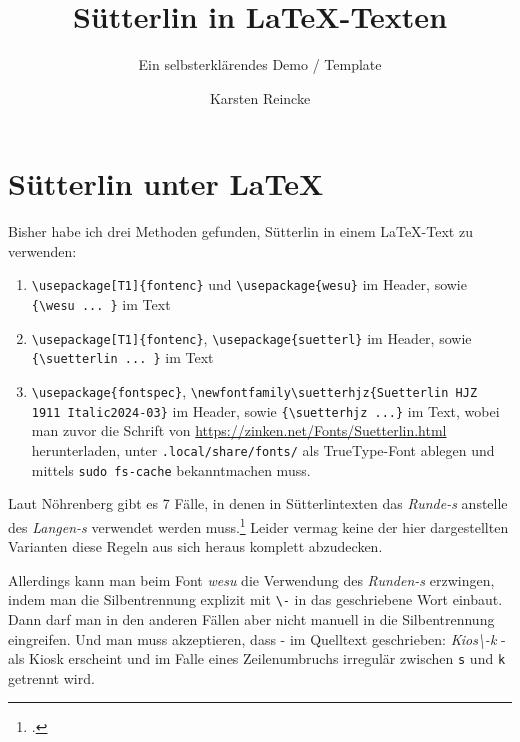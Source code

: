 \documentclass[
  DIV=calc,
  BCOR=5mm,
  11pt,
  headings=small,
  oneside,
  abstract=true,
  toc=bib,
  english,ngerman]{scrartcl}
\begin{document}
\nocite{*}

\titlehead{proSuetterlin.ltx}
\subject{Release }
\title{Sütterlin in \LaTeX-Texten}
\subtitle{Ein selbsterklärendes Demo / Template}
\author{Karsten Reincke}

\maketitle

\section{Sütterlin unter \LaTeX}

Bisher habe ich drei Methoden gefunden, Sütterlin in einem \LaTeX-Text zu verwenden:

\begin{enumerate}
  \item \texttt{\textbackslash{}usepackage[T1]\{fontenc\}} und \texttt{\textbackslash{}usepackage\{wesu\}} im Header, sowie \texttt{\{\textbackslash{}wesu ... \}} im Text
  \item \texttt{\textbackslash{}usepackage[T1]\{fontenc\}}, \texttt{\textbackslash{}usepackage\{suetterl\}} im Header, sowie \texttt{\{\textbackslash{}suetterlin ... \}} im Text
  \item \texttt{\textbackslash{}usepackage\{fontspec\}}, \texttt{\textbackslash{}newfontfamily\textbackslash{}suetterhjz\{Suetterlin HJZ 1911 Italic2024-03\}} im Header, sowie \texttt{\{\textbackslash{}suetterhjz ...\}} im Text, wobei man zuvor die Schrift von \href{https://zinken.net/Fonts/Suetterlin.html}{https://zinken.net/Fonts/Suetterlin.html} herunterladen, unter \texttt{.local/share/fonts/} als TrueType-Font ablegen und mittels \texttt{sudo fs-cache} bekanntmachen muss.
\end{enumerate}

Laut Nöhrenberg gibt es 7 Fälle, in denen in Sütterlintexten das \textit{Runde-s} anstelle des \textit{Langen-s} verwendet werden muss.\footcite[vgl.][15ff]{Noehrenberg2022b} Leider vermag keine der hier dargestellten Varianten diese Regeln aus sich heraus komplett abzudecken. 

Allerdings kann man beim Font \textit{wesu} die Verwendung des \textit{Runden-s} erzwingen, indem man die Silbentrennung explizit mit \texttt{\textbackslash -} in das geschriebene Wort einbaut. Dann darf man in den anderen Fällen aber nicht manuell in die Silbentrennung eingreifen. Und man muss akzeptieren, dass - im Quelltext geschrieben: \textit{Kios\textbackslash{}-k} - als {\wesu Kios\-k} erscheint und im Falle eines Zeilenumbruchs irregulär zwischen \texttt{s} und \texttt{k} getrennt wird.
\end{document}

